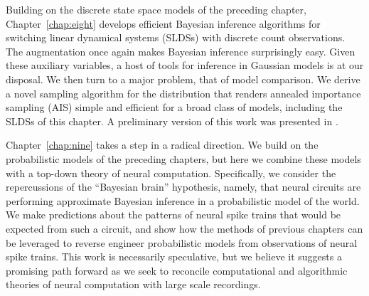 Building on the discrete state space models of the preceding chapter,
Chapter~\ref{chap:eight} develops efficient Bayesian inference
algorithms for switching linear dynamical systems (SLDSs) with
discrete count observations. The \polyagamma augmentation once again
makes Bayesian inference surprisingly easy. Given these auxiliary
variables, a host of tools for inference in Gaussian models is at
our disposal.  We then turn to a major problem, that of model comparison.
We derive a novel sampling algorithm for the \polyagamma distribution
that renders annealed importance sampling (AIS) simple and efficient
for a broad class of models, including the SLDSs of this chapter.
A preliminary version of this work was presented in \citet{linderman2016cosyne}.

Chapter~\ref{chap:nine} takes a step in a radical direction. We build
on the probabilistic models of the preceding chapters, but here we
combine these models with a top-down theory of neural
computation. Specifically, we consider the repercussions of the
``Bayesian brain'' hypothesis, namely, that neural circuits are
performing approximate Bayesian inference in a probabilistic model of
the world. We make predictions about the patterns of neural spike
trains that would be expected from such a circuit, and show how the
methods of previous chapters can be leveraged to reverse engineer
probabilistic models from observations of neural spike trains. This
work is necessarily speculative, but we believe it suggests a
promising path forward as we seek to reconcile computational and
algorithmic theories of neural computation with large scale
recordings.


